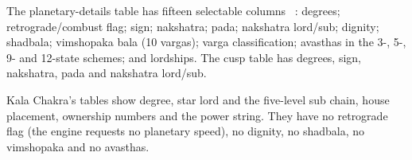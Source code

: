 The planetary-details table has fifteen selectable columns \tagDOC\
\parencite[p.~145]{geovision2006pl7}: degrees; retrograde/combust flag; sign; nakshatra;
pada; nakshatra lord/sub; dignity; shadbala; vimshopaka bala (10 vargas); varga
classification; avasthas in the 3-, 5-, 9- and 12-state schemes; and lordships. The cusp
table has degrees, sign, nakshatra, pada and nakshatra lord/sub.

Kala Chakra's tables show degree, star lord and the five-level sub chain, house placement,
ownership numbers and the power string. They have no retrograde flag (the engine requests
no planetary speed), no dignity, no shadbala, no vimshopaka and no avasthas.

